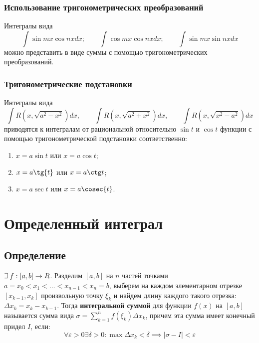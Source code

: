 \documentclass[a4paper,12pt,oneside]{extbook}
\def\lets{%
    \mathord{\setbox0=\hbox{$\exists$}%
        \hbox{\kern 0.125\wd0%
            \vbox to \ht0{%
                \hrule width 0.75\wd0%
                \vfill%
                \hrule width 0.75\wd0}%
            \vrule height \ht0%
            \kern 0.125\wd0}%
    }%
    \hspace{2pt}
}
\theoremstyle{numbered}
\theoremstyle{unnumbered}
\theoremstyle{named}
\theoremstyle{unnumbered}
\theoremstyle{named}
\theoremstyle{named}
\theoremstyle{named}
\begin{document}
\subsection{Использование тригонометрических преобразований}%
\label{sub:Использование тригонометрических преобразований}

Интегралы вида
\begin{equation}
    \int \sin{mx}\cos{nx}dx;
    \qquad
    \int \cos{mx}\cos{nx}dx;
    \qquad
    \int \sin{mx}\sin{nx}dx
\end{equation}
можно представить в виде суммы с помощью тригонометрических преобразований.

\subsection{Тригонометрические подстановки}%
\label{sub:Тригонометрические подстановки}

Интегралы вида
\begin{equation}
    \int R(x, \sqrt{a^2 - x^2})dx, \qquad \int R(x, \sqrt{a^2 + x^2})dx, \qquad \int R(x, \sqrt{x^2 - a^2})dx
\end{equation}
приводятся к интегралам от рациональной относительно \(\sin{t}\) и \(\cos{t}\) функции с помощью тригонометрической подстановки соответственно:
\begin{enumerate}
    \item \(x = a\sin{t}\) или \(x = a\cos{t}\);
    \item \(x = a\tg{t}\) или \(x = a\ctg t\);
    \item \(x = a\sec{t}\) или \(x = a\cosec{t}\).
\end{enumerate}


\chapter{Определенный интеграл}%
\label{cha:Определенный интеграл}

\section{Определение}%
\label{sec:Определение}

\(\lets f: [a, b] \to R\). Разделим \([a, b]\) на \(n\) частей точками \(a = x_0 < x_1 < \ldots < x_{n - 1} < x_n = b\), выберем на каждом элементарном отрезке \([x_{k - 1}, x_k]\) произвольную точку \(\xi_k\) и найдем длину каждого такого отрезка: \(\Delta x_k = x_k - x_{k - 1}\). Тогда \textbf{интегральной суммой} для функции \(f(x)\) на \([a, b]\) называется сумма вида \(\sigma = \displaystyle \sum_{k=1}^n f(\xi_k) \Delta x_k\), причем эта сумма имеет конечный придел \(I\), если:
\[
    \forall \varepsilon > 0 \exists \delta > 0: \max{\Delta x_k} < \delta \implies |\sigma - I| < \varepsilon
\]
\end{document}
